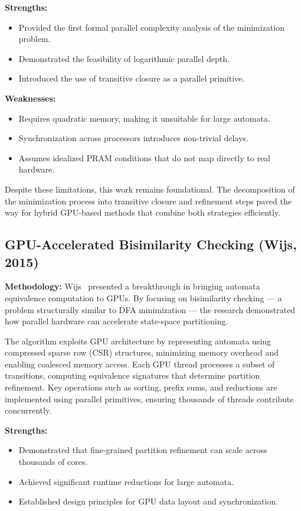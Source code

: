\textbf{Strengths:}
\begin{itemize}
    \item Provided the first formal parallel complexity analysis of the minimization problem.
    \item Demonstrated the feasibility of logarithmic parallel depth.
    \item Introduced the use of transitive closure as a parallel primitive.
\end{itemize}

\textbf{Weaknesses:}
\begin{itemize}
    \item Requires quadratic memory, making it unsuitable for large automata.
    \item Synchronization across processors introduces non-trivial delays.
    \item Assumes idealized PRAM conditions that do not map directly to real hardware.
\end{itemize}

Despite these limitations, this work remains foundational. The decomposition of the minimization process into transitive closure and refinement steps paved the way for hybrid GPU-based methods that combine both strategies efficiently.

\subsection{GPU-Accelerated Bisimilarity Checking (Wijs, 2015)}

\textbf{Methodology:}
Wijs~\cite{wijs2015} presented a breakthrough in bringing automata equivalence computation to GPUs. By focusing on bisimilarity checking — a problem structurally similar to DFA minimization — the research demonstrated how parallel hardware can accelerate state-space partitioning.

The algorithm exploits GPU architecture by representing automata using compressed sparse row (CSR) structures, minimizing memory overhead and enabling coalesced memory access. Each GPU thread processes a subset of transitions, computing equivalence signatures that determine partition refinement. Key operations such as sorting, prefix sums, and reductions are implemented using parallel primitives, ensuring thousands of threads contribute concurrently.

\textbf{Strengths:}
\begin{itemize}
    \item Demonstrated that fine-grained partition refinement can scale across thousands of cores.
    \item Achieved significant runtime reductions for large automata.
    \item Established design principles for GPU data layout and synchronization.
\end{itemize}

